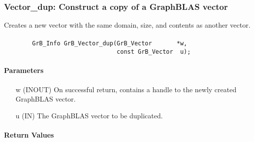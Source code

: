 \subsubsection{{\sf Vector\_dup}: Construct a copy of a GraphBLAS vector}

Creates a new vector with the same domain, size, and contents as another vector.

\paragraph{\syntax}

\begin{verbatim}
        GrB_Info GrB_Vector_dup(GrB_Vector       *w,
                                const GrB_Vector  u);
\end{verbatim}

\paragraph{Parameters}

\begin{itemize}[leftmargin=1.1in]
    \item[{\sf w}]  ({\sf INOUT}) On successful return, contains a handle
                                  to the newly created GraphBLAS vector.
    \item[{\sf u}]  ({\sf IN})    The GraphBLAS vector to be duplicated.
\end{itemize}

\paragraph{Return Values}

